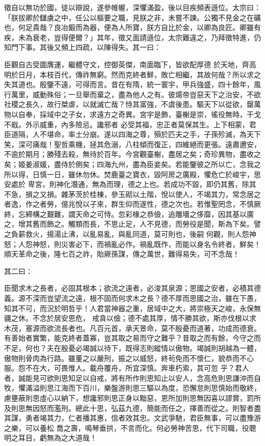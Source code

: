\begin{pinyinscope}
 徵自以無功於國，徒以辯說，遂參帷幄，深懼滿盈，後以目疾頻表遜位。太宗曰：「朕拔卿於讎虜之中，任公以樞要之職，見朕之非，未嘗不諫。公獨不見金之在礦也，何足貴哉？良冶鍛而為器，便為人所寶，朕方自比於金，以卿為良匠。卿雖有疾，未為衰老，豈得便爾？」其年，徵又面請遜位，太宗難違之，乃拜徵特進，仍知門下事。其後又頻上四疏，以陳得失。其一曰：



 臣觀自古受圖膺運，繼體守文，控御英傑，南面臨下，皆欲配厚德
 於天地，齊高明於日月，本枝百代，傳祚無窮。然而克終者鮮，敗亡相繼，其故何哉？所以求之失其道也。殷鑒不遠，可得而言。昔在有隋，統一寰宇，甲兵強盛，四十餘年，風行萬里，威動殊俗；一旦舉而棄之，盡為他人之有。彼煬帝豈惡天下之治安，不欲社稷之長久，故行桀虐，以就滅亡哉？恃其富強，不虞後患。驅天下以從欲，罄萬物以自奉，採域中之子女，求遠方之奇異。宮宇是飾，臺榭是崇，徭役無時，干戈不戢。外示威重，內多險忌。讒邪者
 必受其福，忠正者莫保其生。上下相蒙，君臣道隔，人不堪命，率土分崩。遂以四海之尊，殞於匹夫之手，子孫殄滅，為天下笑，深可痛哉！聖哲乘機，拯其危溺，八柱傾而復正，四維絕而更張。遠肅邇安，不逾於期月；勝殘去殺，無待於百年。今宮觀臺榭，盡居之矣；奇珍異物，盡收之矣；姬姜淑媛，盡侍於側矣；四海九州，盡為臣妾矣。若能鑒彼之所以亡，念我之所以得，日慎一日，雖休勿休。焚鹿臺之寶衣，毀阿房之廣殿，懼危亡於峻宇，思安處於
 卑宮，則神化潛通，無為而理，德之上也。若成功不毀，即仍其舊，除其不急，損之又損。雜茅茨於桂棟，參玉砌以土階，悅以使人，不竭其力，常念居之者逸，作之者勞，億兆悅以子來，群生仰而遂性，德之次也。若惟聖罔念，不慎厥終，忘締構之艱難，謂天命之可恃。忽彩椽之恭儉，追雕墻之侈靡，因其基以廣之，增其舊而飾之。觸類而長，不思止足，人不見德，而勞役是聞，斯為下矣。譬之負薪救火，揚湯止沸，以亂易亂，與亂同道，莫可則也，後嗣
 何觀，則人怨神怒；人怨神怒，則災害必下，而禍亂必作。禍亂既作，而能以身名令終者，鮮矣！順天革命之後，隆七百之祚，貽厥孫謀，傳之萬世，難得易失，可不念哉！



 其二曰：



 臣聞求木之長者，必固其根本；欲流之遠者，必浚其泉源；思國之安者，必積其德義。源不深而豈望流之遠，根不固而何求木之長？德不厚而思國之治，雖在下愚，知其不可，而況於明哲乎！人君當神器之重，居域中之大，將崇極天之峻，永保無疆之休。不念於居安思危，
 戒貪以儉；德不處其厚，情不勝其欲，斯亦伐根以求木茂，塞源而欲流長者也。凡百元首，承天景命，莫不殷憂而道著，功成而德衰。有善始者實繁，能克終者蓋寡，豈其取之易而守之難乎？昔取之而有餘，今守之而不足，何也？夫在殷憂必竭誠以待下，既得志則縱情以傲物。竭誠則胡越為一體，傲物則骨肉為行路。雖董之以嚴刑，振之以威怒，終茍免而不懷仁，貌恭而不心服。怨不在大，可畏惟人。載舟覆舟，所宜深慎。奔車朽索，其可忽
 乎？君人者，誠能見可欲則思知足以自戒，將有所作則思知止以安人，念高危則思謙沖而自牧，懼滿溢則思江海而下百川，樂盤游則思三驅以為度，恐懈怠則思慎始而敬終，慮壅蔽則思虛心以納下，想讒邪則思正身以黜惡，恩所加則思無因喜以謬賞，罰所及則思無因怒而濫刑。總此十思，弘茲九德，簡能而任之，擇善而從之。則智者盡其謀，勇者竭其力，仁者播其惠，信者效其忠。文武爭馳，君臣無事，可以盡豫游之樂，可以養松
 喬之壽，鳴琴垂拱，不言而化。何必勞神苦思，代下司職，役聰明之耳目，虧無為之大道哉！




\end{pinyinscope}

